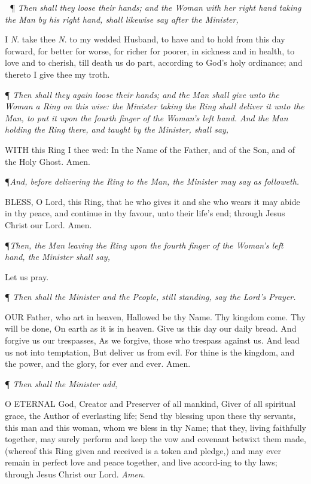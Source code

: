
¶ \emph{Then shall they loose their hands; and the Woman with her right
hand taking the Man by his right hand, shall likewise say after the Minister,}

I
\emph{N}. take thee \emph{N}. to my wedded Husband, to have and to
hold from this day forward, for better for worse, for richer for poorer,
in sickness and in health, to love and to cherish, till death us do part,
according to God's holy ordinance; and thereto I give thee my troth.

¶
\emph{Then shall they again loose their hands; and the Man shall give unto
the Woman a Ring on this wise: the Minister taking the Ring shall deliver
it unto the Man, to put it upon the fourth finger of the Woman’s
left hand. And the Man holding the Ring there, and taught by the Minister,
shall say,}

WITH
this Ring I thee wed: In the Name of the Father, and of the Son, and of
the Holy Ghost. Amen. 

¶\emph{And, before delivering the Ring to the Man, the Minister may say as
followeth.}

BLESS,
O Lord, this Ring, that he who gives it and she who wears it may abide
in thy peace, and continue in thy favour, unto their life's end; through
Jesus Christ our Lord. Amen.

¶\emph{Then, the Man leaving the Ring upon the fourth finger of the Woman's left
hand, the Minister shall say,}

Let us
pray.

¶
\emph{Then shall the Minister and the People, still standing, say the Lord's
Prayer.}

OUR
Father, who art in heaven, Hallowed be thy Name. Thy kingdom come. Thy
will be done, On earth as it is in heaven. Give us this day our daily
bread. And forgive us our trespasses, As we forgive, those who trespass
against us. And lead us not into temptation, But deliver us from evil.
For thine is the kingdom, and the power, and the glory, for ever and ever.
Amen.

¶
\emph{Then shall the Minister add,}

O
ETERNAL God, Creator and Preserver of all mankind, Giver of all spiritual
grace, the Author of everlasting life; Send thy blessing upon these thy
servants, this man and this woman, whom we bless in thy Name; that they,
living faithfully together, may surely perform and keep the vow and covenant
betwixt them made, (whereof this Ring given and received is a token and
pledge,) and may ever remain in perfect love and peace together, and live
accord-ing to thy laws; through Jesus Christ our Lord. \emph{Amen}.

